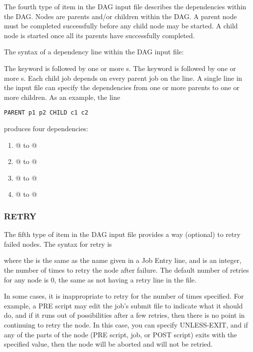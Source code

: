 The fourth type of item in the DAG input file describes the
dependencies within the DAG.
Nodes are parents and/or children within the DAG.
A parent node must be completed successfully before
any child node may be started.
A child node is started once
all its parents have successfully completed.

The syntax of a dependency line within the DAG input file:

   

The  keyword is followed by one or more
s.
The  keyword is followed by one or more
s.
Each child job depends on every parent job on the line.
A single line in the input file can specify the dependencies from one or more
parents to one or more children.
As an example, the line
\begin{verbatim}
PARENT p1 p2 CHILD c1 c2
\end{verbatim}
produces four dependencies:
\begin{enumerate}
\item{@ to @}
\item{@ to @}
\item{@ to @}
\item{@ to @}
\end{enumerate}

\subsubsection{RETRY}

The fifth type of item in the DAG input file provides a
way (optional) to retry failed nodes.
The syntax for retry is

   

where the  is the same as the name given in
a Job Entry line, and  is an integer,
the number of times to retry the node after failure.
The default number of retries for any node is 0,
the same as not having a retry line in the file. 

In some cases, it is inappropriate to retry for the number of times
specified. For example, a PRE script may edit the job's submit file to
indicate what it should do, and if it runs out of possibilities after
a few retries, then there is no point in continuing to retry the
node. In this case, you can specify UNLESS-EXIT, and if any of the
parts of the node (PRE script, job, or POST script) exits with the
specified value, then the node will be aborted and will not be
retried.

